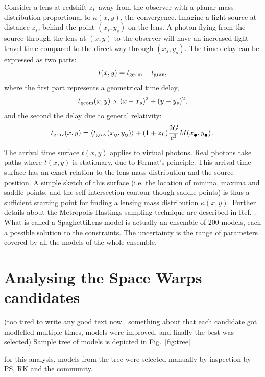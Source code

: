 \documentclass{ws-procs975x65}
\newcommand{\spl}{SpaghettiLens\xspace}
\newcommand{\sw}{Space Warps\xspace}
\newcommand{\icite}[1]{Ref.~\refcite{#1}}  %
\newcommand{\figref}[1]{Fig.~\ref{fig:#1}}
\newcommand{\tgeom}{t_{\rm geom}}
\newcommand{\tgrav}{t_{\rm grav}}
\newcommand{\subcirc}{{\lower.33ex\hbox{$\circ$}}}
\newcommand{\subbullet}{{\lower.33ex\hbox{$\bullet$}}}
\begin{document}
Consider a lens at redshift $z_L$ away from the observer with a planar mass distribution proportional to $\kappa(x,y)$, the convergence.
Imagine a light source at distance $z_s$, behind the point $(x_s,y_s)$ on the lens.
A photon flying from the source through the lens at $(x,y)$ to the observer will have an increased light travel time compared to the direct way through $(x_s,y_s)$.
The time delay can be expressed as two parts:
\begin{equation}  \label{eq:tarriv}
t(x,y) = t_{\rm geom} + t_{\rm grav} ,
\end{equation}
where the first part represents a geometrical time delay,
\begin{equation} \label{eq:tgeom}
\tgeom(x,y) \propto (x-x_s)^2 + (y-y_s)^2 ,
\end{equation}
and the second the delay due to general relativity:
\begin{equation} \label{eq:tgrav}
\tgrav(x,y) = \left\langle \tgrav(x_\subcirc,y_\subcirc) \right\rangle
              + (1+z_L) \frac{2G}{c^3} M(x_\subbullet,y_\subbullet) \,.
\end{equation}

The arrival time surface $t(x,y)$ applies to virtual photons.
Real photons take paths where $t(x,y)$ is stationary, due to Fermat's principle.
This arrival time surface has an exact relation to the lens-mass distribution and the source position.
A simple sketch of this surface (i.e. the location of minima, maxima and saddle points, and the self intersection contour though saddle points) is thus a sufficient starting point for finding a lensing mass distribution $\kappa(x,y)$. Further details about the Metropolis-Hastings sampling technique are described in \icite{Lubini2012}.
What is called a \spl model is actually an ensemble of 200 models, each a possible solution to the constraints. The uncertainty is the range of parameters covered by all the models of the whole ensemble.


\section{Analysing the \sw candidates}

(too tired to write any good text now..
something about that each candidate got modlelled multiple times, models were improved, and finally the best was selected) Sample tree of models is depicted in \figref{tree}

for this analysis, models from the tree were selected manually by inspection by PS, RK and the community.
\end{document}
